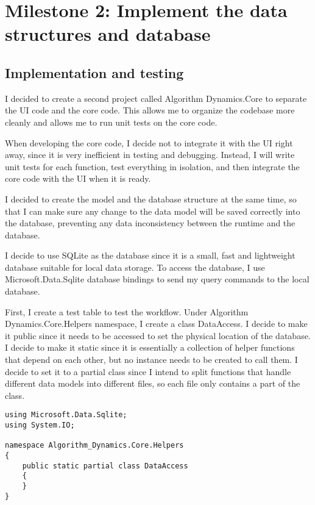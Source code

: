 \documentclass[report.tex]{subfiles}
\begin{document}
\section{Milestone 2: Implement the data structures and database}

\subsection{Implementation and testing}

I decided to create a second project called Algorithm Dynamics.Core to separate the UI code and the core code. This allows me to organize the codebase more cleanly and allows me to run unit tests on the core code.

When developing the core code, I decide not to integrate it with the UI right away, since it is very inefficient in testing and debugging. Instead, I will write unit tests for each function, test everything in isolation, and then integrate the core code with the UI when it is ready.

I decided to create the model and the database structure at the same time, so that I can make sure any change to the data model will be saved correctly into the database, preventing any data inconsistency between the runtime and the database.

I decide to use SQLite\cite{sqlite} as the database since it is a small, fast and lightweight database suitable for local data storage. To access the database, I use Microsoft.Data.Sqlite\cite{microsoft:docs:sqlite} database bindings to send my query commands to the local database.

First, I create a test table to test the workflow. Under Algorithm Dynamics.Core.Helpers namespace, I create a class DataAccess. I decide to make it public since it needs to be accessed to set the physical location of the database. I decide to make it static since it is essentially a collection of helper functions that depend on each other, but no instance needs to be created to call them. I decide to set it to a partial class since I intend to split functions that handle different data models into different files, so each file only contains a part of the class.

\begin{verbatim}
using Microsoft.Data.Sqlite;
using System.IO;

namespace Algorithm_Dynamics.Core.Helpers
{
    public static partial class DataAccess
    {
    }
}
\end{verbatim}
\end{document}
